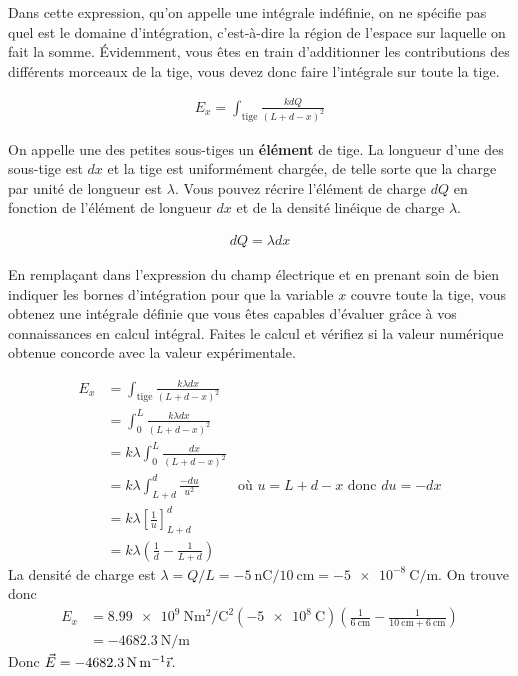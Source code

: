 Dans cette expression, qu'on appelle une intégrale indéfinie, on ne spécifie
pas quel est le domaine d'intégration, c'est-à-dire la région de l'espace sur
laquelle on fait la somme. Évidemment, vous êtes en train d'additionner les
contributions des différents morceaux de la tige, vous devez donc faire
l'intégrale sur toute la tige.

\begin{reponsebox}
  \begin{align*}
    E_{x} = \int_\mathrm{tige} \frac{k dQ}{(L + d - x)^2}
  \end{align*}
\end{reponsebox}

On appelle une des petites sous-tiges un \textbf{élément} de tige. La
longueur d'une des sous-tige est $dx$ et la tige est uniformément chargée,
de telle sorte que la charge par unité de longueur est $\lambda$. Vous pouvez
récrire l'élément de charge $dQ$ en fonction de l'élément de longueur $dx$ et
de la densité linéique de charge $\lambda$.

\begin{reponsebox}
  \begin{align*}
    dQ = \lambda dx
  \end{align*}
\end{reponsebox}

En remplaçant dans l'expression du champ électrique et en prenant soin de bien
indiquer les bornes d'intégration pour que la variable $x$ couvre toute la
tige, vous obtenez une intégrale définie que vous êtes capables d'évaluer grâce
à vos connaissances en calcul intégral. Faites le calcul et vérifiez si la
valeur numérique obtenue concorde avec la valeur expérimentale.

\begin{reponsebox}
  \begin{align*}
    E_{x} &= \int_\mathrm{tige} \frac{k \lambda dx}{(L + d - x)^2} \\
          &= \int_0^L \frac{k \lambda dx}{(L + d - x)^2} \\
          &= k \lambda \int_0^L \frac{dx}{(L + d - x)^2} \\
          &= k \lambda \int_{L + d}^d \frac{-du}{u^2} &
            \text{où } u = L + d - x \text{ donc } du = -dx  \\
          &= k \lambda \left[ \frac{1}{u} \right]_{L + d}^d  \\
          &= k \lambda \left( \frac{1}{d} - \frac{1}{L + d} \right)
  \end{align*}
  La densité de charge est $\lambda = Q/L = \SI{-5}{\nano\coulomb} /
  \SI{10}{\centi\meter} = \SI{-5e-8}{\coulomb\per\meter}$. On trouve donc
  \begin{align*}
    E_x  &= \SI{8.99e9}{\newton\meter\squared\per\coulomb\squared}
            \left( \SI{-5e8}{\coulomb} \right) \left(
              \frac{1}{\SI{6}{\centi\meter}} - \frac{1}{\SI{10}{\centi\meter}
                + \SI{6}{\centi\meter}} \right)  \\
         &= \SI{-4682.3}{\newton\per\meter}
  \end{align*}
  Donc $\vec{E} = \SI{-4682.3}{\newton\per\meter}\vec{\imath}$.
\end{reponsebox}

